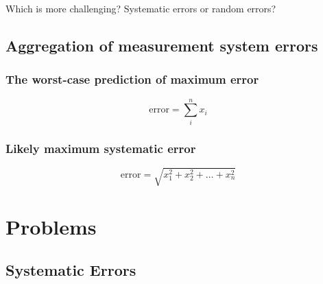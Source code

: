 \documentclass[a4paper,11pt,dvipsnames]{book}
\begin{document}
\begin{question}
Which is more challenging? Systematic errors or random errors?
\end{question}
\begin{solution}


\end{solution}


\section*{Aggregation of measurement system errors}

\subsection*{The worst-case prediction of maximum error}

\begin{equation}
\text{error} = \sum_{i}^{n} x_i
\end{equation}

\subsection*{Likely maximum systematic error}

\begin{equation}
\text{error} = \sqrt{ x_{1}^{2} + x_{2}^{2} + \ldots + x_{n}^{2} }
\end{equation}

\chapter*{Problems}

\section*{Systematic Errors}
\end{document}
